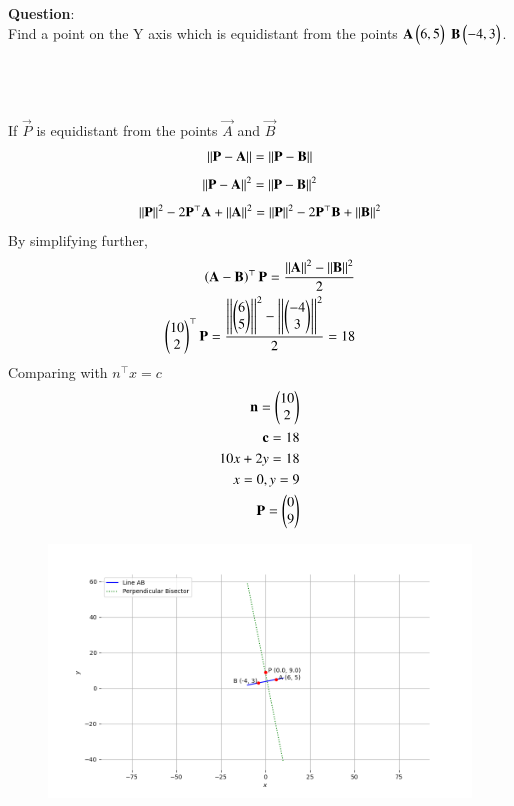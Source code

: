 \documentclass[journal]{IEEEtran}
\begin{document}
\textbf{Question}:\\
Find a point on the Y axis which is equidistant from the points $\mathbf{A}\begin{pmatrix}6,5\end{pmatrix}$ $\mathbf{B}\begin{pmatrix}-4,3\end{pmatrix}$.\\
\\ \solution \\
    \begin{table}[h!]    
      \centering
      
      \caption{}
    \end{table}\\
If $\vec{P}$ is equidistant from the points $\vec{A}$ and $\vec{B}$
    \begin{align}
        \left\vert\left\vert\mathbf{P}-\mathbf{A}\right\vert\right\vert = \left\vert\left\vert\mathbf{P}-\mathbf{B}\right\vert\right\vert \label{eq1.1.9.17.1}
    \end{align}
     \begin{align}
        \left\vert\left\vert\mathbf{P}-\mathbf{A}\right\vert\right\vert^2 = \left\vert\left\vert\mathbf{P}-\mathbf{B}\right\vert\right\vert^2\label{eq1.1.9.17.2}
    \end{align}
    \begin{align}
    	\left\vert\left\vert\mathbf{P}\right\vert\right\vert^2 - 2\mathbf{P}^\top \mathbf{A} + \left\vert\left\vert\mathbf{A}\right\vert\right\vert^2 = \left\vert\left\vert\mathbf{P}\right\vert\right\vert^2 - 2\mathbf{P}^\top\mathbf{B} + \left\vert\left\vert\mathbf{B}\right\vert\right\vert^2\label{eq1.1.9.17.3}
    \end{align}
By simplifying further,
    \begin{align}
    	\left(\mathbf{A}-\mathbf{B}\right)^\top \mathbf{P} = \frac{\left\vert\left\vert\mathbf{A}\right\vert\right\vert^2-\left\vert\left\vert\mathbf{B}\right\vert\right\vert^2}{2} \\
    	\begin{pmatrix}10 \\ 2\end{pmatrix}^\top \mathbf{P} = \frac{\left\vert\left\vert\begin{pmatrix}6 \\ 5\end{pmatrix}\right\vert\right\vert^2-\left\vert\left\vert\begin{pmatrix}-4 \\ 3\end{pmatrix}\right\vert\right\vert^2}{2} = 18\label{eq1.1.9.17.4}
    \end{align}
Comparing with $n^\top x = c$
    \begin{align}
    	\mathbf{n} = \begin{pmatrix}10 \\ 2\end{pmatrix}\\ \label{eq1.1.8.28.5}
	    \mathbf{c} = 18\\
     10x+2y=18\\
     x=0,y=9\\
     \mathbf{P}=\begin{pmatrix}0 \\ 9\end{pmatrix}
    \end{align}
    \begin{figure}[h]
        \centering
       \includegraphics[width=\linewidth]{figs/fig1.png}
       \caption{}
       \label{graph}
    \end{figure}
\end{document}
